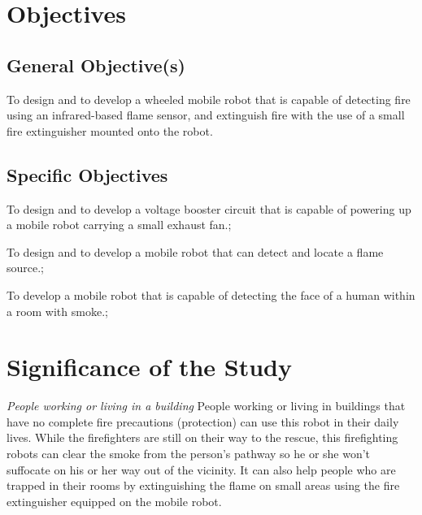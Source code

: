 \section{Objectives}
\subsection{General Objective(s)}
\begin{itemized}
	\item To design and to develop a wheeled mobile robot that is capable of detecting fire using an infrared-based flame sensor, and extinguish fire with the use of a small fire extinguisher mounted onto the robot.
\end{itemized}

\subsection{Specific Objectives}

\begin{itemized}
	\item To design and to develop a voltage booster circuit that is capable of powering up a mobile robot carrying a small exhaust fan.;
	
	\item To design and to develop a mobile robot that can detect and locate a flame source.;
	
	\item To develop a mobile robot that is capable of detecting the face of a human within a room with smoke.;

\end{itemized}



\section{Significance of the Study}

\textit{People working or living in a building} \newline
	People working or living in buildings that have no complete fire precautions (protection) can use this robot in their daily lives. While the firefighters are still on their way to the rescue, this firefighting robots can clear the smoke from the person’s pathway so he or she won’t suffocate on his or her way out of the vicinity. It can also help people who are trapped in their rooms by extinguishing the flame on small areas using the fire extinguisher equipped on the mobile robot. 

